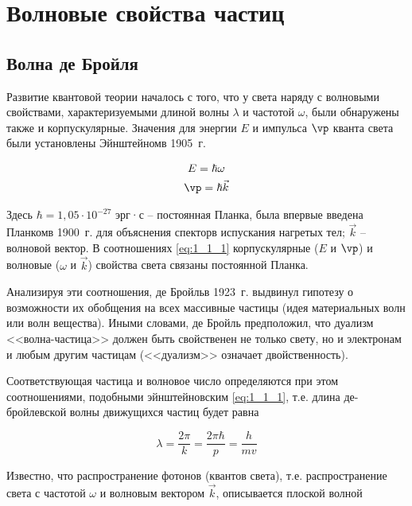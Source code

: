 \chapter{Волновые свойства частиц}

\section{Волна де Бройля}

Развитие квантовой теории началось с того, что у света наряду с волновыми свойствами, характеризуемыми длиной волны $\lambda$ и частотой $\omega$, были обнаружены также и корпускулярные. Значения для энергии $E$ и импульса $\vp$ кванта света были установлены Эйнштейном\footnotemark в 1905~г.

\begin{equation}
\label{eq:1_1_1}
\begin{gathered}
E = \hbar \omega \\ 
\vp = \hbar \vec{k}
\end{gathered}
\end{equation}

Здесь $\hbar = 1{,}05 \cdot 10^{-27}$ эрг·с -- постоянная Планка, была впервые введена Планком\footnotemark в 1900~г. для объяснения спекторв испускания нагретых тел; $\vec{k}$ -- волновой вектор. В соотношениях \eqref{eq:1_1_1} корпускулярные ($E$ и $\vp$) и волновые ($\omega$ и $\vec{k}$) свойства света связаны постоянной Планка.

Анализируя эти соотношения, де Бройль\footnotemark в 1923~г. выдвинул гипотезу о возможности их обобщения на всех массивные частицы (идея материальных волн или волн вещества). Иными словами, де Бройль предположил, что дуализм <<волна-частица>> должен быть свойственен не только свету, но и электронам и любым другим частицам (<<дуализм>> означает двойственность).

Соответствующая частица и волновое число определяются при этом соотношениями, подобными эйнштейновским \eqref{eq:1_1_1}, т.е. длина де-бройлевской волны движущихся частиц будет равна

\begin{equation}
\label{eq:1_1_2}
\lambda = \frac{2\pi}{k} = \frac{2\pi \hbar}{p} = \frac{h}{mv}
\end{equation}

Известно, что распространение фотонов (квантов света), т.е. распространение света с частотой $\omega$ и волновым вектором $\vec{k}$, описывается плоской волной

